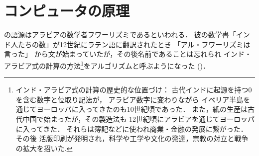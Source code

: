 %
%
%
%
%
%
%   
%

\chapter{コンピュータの原理}
の語源はアラビアの数学者フワーリズミであるといわれる．
彼の数学書「インド人たちの数」が12世紀にラテン語に翻訳されたとき
「アル・フワーリズミは言った」
から文が始まっていたが，その後名前であることは忘れられ
インド・アラビア式の計算の方法\footnote{
インド・アラビア式の計算の歴史的な位置づけ：
古代インドに起源を持つ$0$を含む数字と位取り記法が，
アラビア数字に変わりながら
イベリア半島を通じてヨーロッパに入ってきたのも10世紀頃であった．
また，紙の生産は古代中国で始まったが，その製造法も
12世紀頃にアラビアを通じてヨーロッパに入ってきた．
それらは簿記などに使われ商業・金融の発展に繋がった\cite{T}．
その後
活版印刷が発明され，科学や工学や文化の発達，宗教の対立と戦争の拡大を招いた.}をアルゴリズムと呼ぶようになった 
(\cite{Mu})．

